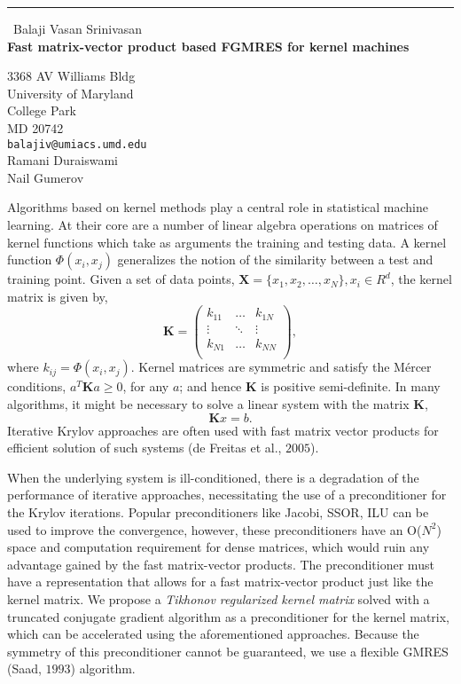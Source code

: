 \documentclass{report}
\begin{document}
\begin{center}
\rule{6in}{1pt} \
{\large Balaji Vasan Srinivasan \\
{\bf Fast matrix-vector product based FGMRES for kernel machines}}

3368 AV Williams Bldg \\ University of Maryland \\ College Park \\ MD 20742
\\
{\tt balajiv@umiacs.umd.edu}\\
Ramani Duraiswami\\
Nail Gumerov\end{center}

Algorithms based on kernel methods play a central role in statistical
machine learning. At their core are a number of linear algebra operations
on matrices of kernel functions which take as arguments the training and
testing data. A kernel function $\Phi(x_i,x_j)$ generalizes the notion of
the similarity between a test and training point. Given a set of data
points, $\mathbf{X}=\{x_1,x_2,\ldots,x_N\}, x_i\in R^d$, the kernel
matrix is given by,
\begin{equation}
\mathbf{K} = \left(
\begin{array}{ccc}
k_{11} & \ldots & k_{1N}\\
\vdots & \ddots & \vdots\\
k_{N1} & \ldots & k_{NN}\\
\end{array}
\right),
\end{equation}
where $k_{ij}=\Phi(x_i,x_j)$. Kernel matrices are symmetric and satisfy
the M\'ercer conditions, $a^T\mathbf{K}a\geq0$, for any $a$; and hence
$\mathbf{K}$ is positive semi-definite. In many algorithms, it might be
necessary to solve a linear system with the matrix $\mathbf{K}$,
\begin{equation}\mathbf{K}x=b.\end{equation}
Iterative Krylov approaches are often used with fast matrix vector
products for efficient solution of such systems (de Freitas et al.,
$2005$).

When the underlying system is ill-conditioned, there is a degradation of
the performance of iterative approaches, necessitating the use of a
preconditioner for the Krylov iterations. Popular preconditioners like
Jacobi, SSOR, ILU can be used to improve the convergence, however, these
preconditioners have an O($N^2$) space and computation requirement for
dense matrices, which would ruin any advantage gained by the fast
matrix-vector products. The preconditioner must have a representation
that allows for a fast matrix-vector product just like the kernel matrix.
We propose a \emph{Tikhonov regularized kernel matrix }solved with a
truncated conjugate gradient algorithm as a preconditioner for the kernel
matrix, which can be accelerated using the aforementioned approaches.
Because the symmetry of this preconditioner cannot be guaranteed, we use
a flexible GMRES (Saad, $1993$) algorithm.
\end{document}
